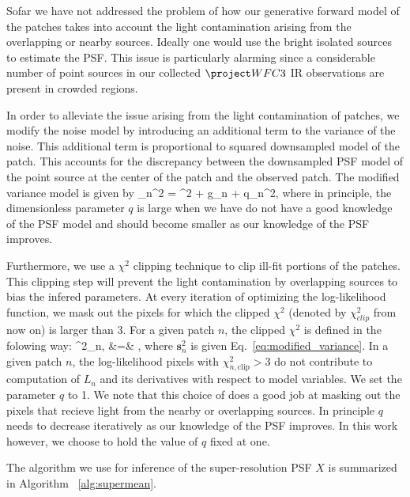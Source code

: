 Sofar we have not addressed the problem of how our generative forward model of the patches takes into account the light contamination arising from 
the overlapping or nearby sources. Ideally one would use the bright isolated sources to estimate the PSF. This issue is particularly alarming since 
a considerable number of point sources in our collected $\wfc$ IR observations are present in crowded regions. 

In order to alleviate the issue arising from the light contamination of patches, we modify the noise model by introducing an additional term to the variance 
of the noise. This additional term is proportional to squared downsampled model of the patch. This accounts for the discrepancy between the downsampled PSF model of the 
point source at the center of the patch and the observed patch. The modified variance model is given by
\beq
{}_n^2 = \sigma^{2} + g_{n} + q_{n}^{2},
\label{eq:modified_variance}
\eeq 
where in principle, the dimensionless parameter $q$ is large when we have do not have a good knowledge of the PSF model and should become 
smaller as our knowledge of the PSF improves. 

Furthermore, we use a $\chi^2$ clipping technique to clip ill-fit portions of the patches. 
This clipping step will prevent the light contamination by overlapping sources to bias the infered parameters. 
At every iteration of optimizing the log-likelihood function, we mask out the pixels for which the clipped $\chi^{2}$ 
(denoted by $\chi^{2}_{clip}$ from now on) is larger than 3. For a given patch $n$, the clipped $\chi^{2}$ is defined in the folowing way:
\beq
\chi^{2}_{n,} &=& , 
\eeq
where $\mathbf{s}_{n}^{2}$ is given Eq.~\ref{eq:modified_variance}. In a given patch $n$, the log-likelihood pixels with $\chi^{2}_{n,\mathrm{clip}} > 3$ 
do not contribute to computation of $L_n$ and its derivatives with respect to model variables. 
We set the parameter $q$ to 1. We note that this choice of does a good job at masking out the pixels that recieve light from the nearby or overlapping sources. 
In principle $q$ needs to decrease iteratively as our knowledge of the PSF improves. In this work however, we choose to hold the value of $q$ fixed at one. 

The algorithm we use for inference of the super-resolution PSF $X$ is summarized in Algorithm ~\ref{alg:supermean}.

